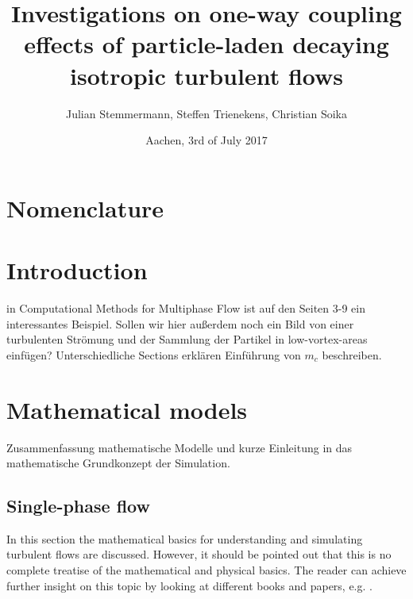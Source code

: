 \documentclass[a4paper,12pt]{article}
\title{Investigations on one-way coupling effects of particle-laden decaying isotropic turbulent flows}
\author{Julian Stemmermann, Steffen Trienekens, Christian Soika}
\date{Aachen, 3rd of July 2017}
\numberwithin{equation}{section} %
\begin{document}
\maketitle

\setlength{\columnsep}{30pt}

\pagebreak

\tableofcontents{} %
 
\pagebreak

\section{Nomenclature}
\begin{multicols}{2}
\setlength{\columnseprule}{1pt}
\printnomenclature
\end{multicols}
\pagebreak

\section{Introduction}
in Computational Methods for Multiphase Flow ist auf den Seiten 3-9 ein interessantes Beispiel.
Sollen wir hier außerdem noch ein Bild von einer turbulenten Strömung und der Sammlung der Partikel in low-vortex-areas einfügen?
Unterschiedliche Sections erklären
Einführung von $m_c$ beschreiben. 
\pagebreak
\section{Mathematical models}
Zusammenfassung mathematische Modelle und kurze Einleitung in das mathematische Grundkonzept der Simulation.
\subsection{Single-phase flow} %
In this section the mathematical basics for understanding and simulating turbulent flows are discussed. However, it should be pointed out that this is no
complete treatise of the mathematical and physical basics. The reader can achieve further insight on this topic by looking at different books and papers, 
e.g. \cite{turbulentFlows}.
\newline
\end{document}
